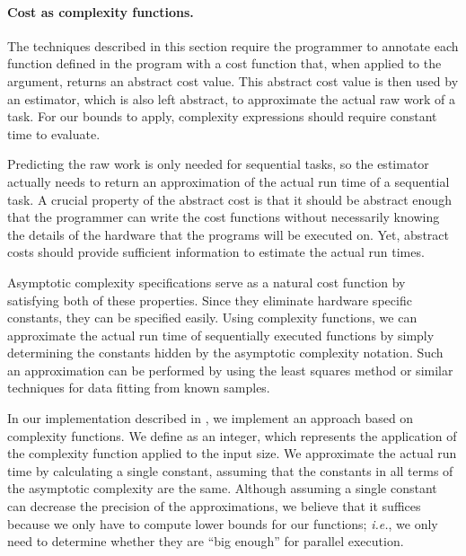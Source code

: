 \paragraph{Cost as complexity functions.} 

The techniques described in this section require the programmer to
annotate each function defined in the program with a cost function
that, when applied to the argument, returns an abstract cost value.
This abstract cost value is then used by an estimator, which is also
left abstract, to approximate the actual raw work of a task. 
For our bounds to apply, complexity expressions
should require constant time to evaluate.

Predicting the raw work is only needed for sequential tasks,
so the estimator actually needs to return an approximation of the actual run
time of a sequential task.  A crucial property of the abstract cost is
that it should be abstract enough that the programmer can write the
cost functions without necessarily knowing the details of the hardware
that the programs will be executed on.  Yet, abstract costs should
provide sufficient information to estimate the actual run times.   

Asymptotic complexity specifications serve as a natural cost function
by satisfying both of these properties.  Since they eliminate hardware
specific constants, they can be specified easily.  Using complexity
functions, we can approximate the actual run time of sequentially
executed functions by simply determining the constants hidden by the
asymptotic complexity notation.  Such an approximation can be
performed by using the least squares method or similar techniques for
data fitting from known samples.

In our implementation described in , we implement an
approach based on complexity functions.  We define \kwtypeofcost as an
integer, which represents the application of the complexity function
applied to the input size.  We approximate the actual run time by
calculating a single constant, assuming that the constants in all
terms of the asymptotic complexity are the same.  Although assuming a
single constant can decrease the precision of the approximations, we
believe that it suffices because we only have to compute lower bounds
for our functions; \textit{i.e.}, we only need to determine whether they are
``big enough'' for parallel execution.



